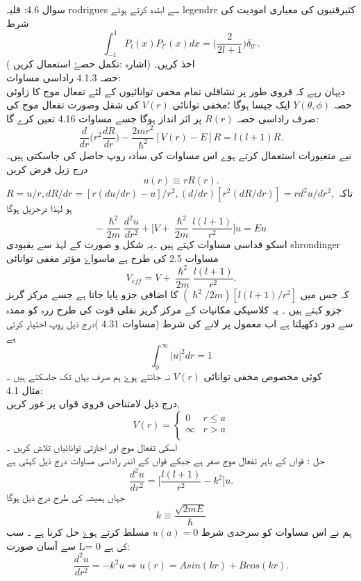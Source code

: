 \documentclass{book}
\begin{document}
سوال 4.6:
قلیہ rodrigues سے ابتدہ کرتے ہوئے legendre کثیرقنیوں کی معیاری امودیت کی شرط\\
\[\int_{-1}^{1}P_{l}(x)P_{l'}(x)dx=\big(\frac{2}{2l+1}\big)\delta_{ll'}.\]
اخذ کریں۔ (اشارہ :تکمل حصۓ استعمال کریں )\\
حصہ 4.1.3 راداسی مساوات:\\
دیہان رہے کہ قروی طور پر تشاقلی تمام مخفی توانائیوں کے لئے تفعال موج کا زاوئی حصہ
\(Y(\theta,\phi)\)
ایک جیسا ہوگا ؛مخفی توانائی
\(V(r)\)
کی شقل وصورت تفعال موج کی صرف راداسی حصہ
\(R(r)\)
پر اثر انداز ہوگا جسے مساوات 4.16 تعین کرے گا:\\
\[\frac{d}{dr}\big(r^{2}\frac{dR}{dr}\big)-\frac{2mr^{2}}{\hslash^{2}}[V(r)-E]R=l(l+1)R.\]
نیے متغیورات استعمال کرتے ہوے اس مساوات کی سادہ روپ حاصل کی جاسکتی ہیں۔ درج زیل فرض کریں\\
\[u(r)\equiv{rR(r).}\]  
تاکہ
\(R=u/r,dR/dr=[r(du/dr)-u]/r^{2},(d/dr)[r^{2}(dR/dr)]=rd^{2}u/dr^{2},\)
ہو لہٰذا درجزیل ہوگا \\
\[\boxed{-\frac{\hslash^{2}}{2m}\frac{d^{2}u}{dr^{2}}+\big[V+\frac{\hslash^{2}}{2m}\frac{l(l+1)}{r^{2}}\big]u=Eu}\]
اسکو قداسی مساوات کہتے ہیں ۔یہ شکل و صورت کے لہٰذ سے یقبودی shrondinger مساوات 2.5 کی طرح ہے ماسواۓ مؤثر مغفی توانائی \\
\[V_{eff}=V+\frac{\hslash^{2}}{2m}\frac{l(l+1)}{r^{2}}.\]
کہ جس میں
\((\hslash^{2}/2m)[l(l+1)/r^{2}]\)
کا اضافی جزو پایا جاتا ہے جسے مرکز گریز جزو کہتے ہیں ۔ یہ كلاسیكی مکانیات کے مرکز گریز نقلی قوت کی طرح زرہ کو ممدہ سے دور دکھیلتا ہے اب معمول پر لانے کی شرط (مساوات 4.31 )درج ذیل روپ اختیار کرتی ہے\\ 
\[\int_{0}^{\infty}|u|^{2}dr=1\]
کوئی مخصوص مخفی توانائی
\(V(r)\)
نہ جانتے ہوۓ ہم صرف یہاں تک جاسکتے ہیں ۔\\
مثال 4.1:\\
درج ذیل لامتناحی قروی قواں پر غور کریں,
\[V(r)=\begin{cases}0&r\leq{a}\\\infty&r>a\\\end{cases}\]
اسکی تفعال موج اور اجازتی توانائیاں تلاش کریں ۔\\
حل :
قواں کے باہر تفعال موج صفر ہے جبکے قواں کے اندر راداسی مساوات درج ذیل کہتی ہے\\
\[\frac{d^{2}u}{dr^{2}}=\big[\frac{l(l+1)}{r^{2}}-k^{2}\big]u.\]
جہاں ہمیشہ کی طرح درج ذیل ہوگا 
\[k\equiv\frac{\sqrt{2mE}}{\hslash}\]
ہم نے اس مساوات کو سرحدی شرط
\(u(a)=0\)
مسلط کرتے ہوۓ حل کرنا ہے ۔ سب سے آسان صورت L= 0 کی ہے:\\
\[\frac{d^{2}u}{dr^{2}}=-k^{2}u\Rightarrow{u(r)=Asin(kr)+Bcos(kr).}\]
\end{document}
